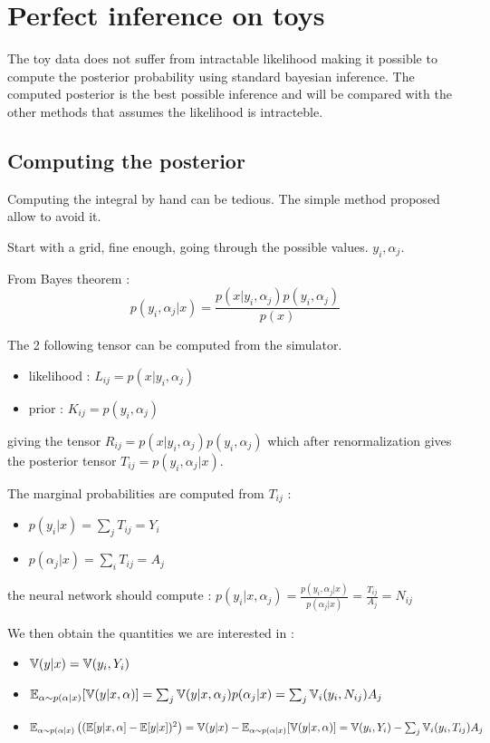 \section{Perfect inference on toys} %
\label{sec:perfect_inference_on_toys}


The toy data does not suffer from intractable likelihood making it possible to compute the posterior probability using standard bayesian inference.
The computed posterior is the best possible inference and will be compared with the other methods that assumes the likelihood is intracteble.

\subsection{Computing the posterior} %
\label{sub:computing_the_posterior}


Computing the integral by hand can be tedious.
The simple method proposed allow to avoid it.

Start with a grid, fine enough, going through the possible values. $y_i, \alpha_j$.

From Bayes theorem : 
$$
    p(y_i, \alpha_j | x) = \frac{p(x|y_i, \alpha_j) p(y_i, \alpha_j)}{p(x)}
$$

The 2 following tensor can be computed from the simulator.
\begin{itemize}
  \item likelihood : $L_{ij} = p(x|y_i, \alpha_j)$
  \item prior : $K_{ij} = p(y_i, \alpha_j)$ 
\end{itemize}

giving the tensor $ R_{ij} = p(x|y_i, \alpha_j) p(y_i, \alpha_j) $ 
which after renormalization gives the posterior tensor $ T_{ij} = p(y_i, \alpha_j | x)$.

The marginal probabilities are computed from $T_{ij}$ :
\begin{itemize}
  \item $p(y_i | x) = \sum_j T_{ij} = Y_i$
  \item $p(\alpha_j | x) = \sum_i T_{ij} = A_j$
\end{itemize}

the neural network should compute : $p(y_i | x, \alpha_j) = \frac{p(y_i, \alpha_j | x)}{p(\alpha_j | x)} = \frac{T_{ij}}{A_j} = N_{ij}$

We then obtain the quantities we are interested in :
\begin{itemize}
  \item $ \mathbb{V}(y|x) = \mathbb{V}(y_i, Y_i) $
  \item $ \mathbb{E}_{\alpha \sim p(\alpha|x)}[ \mathbb{V}(y|x, \alpha) ] = \sum_j \mathbb{V}(y|x, \alpha_j) p(\alpha_j | x) = \sum_j \mathbb{V}_i(y_i, N_{ij}) A_j$
  \item $\mathbb{E}_{\alpha \sim p(\alpha|x)} \left ((\mathbb{E} [y|x, \alpha]  - \mathbb{E}[y|x])^2\right ) = \mathbb{V}(y|x) - \mathbb{E}_{\alpha \sim p(\alpha|x)}[ \mathbb{V}(y|x, \alpha) ] = \mathbb{V}(y_i, Y_i) - \sum_j \mathbb{V}_i(y_i, T_{ij}) A_j$
\end{itemize}


